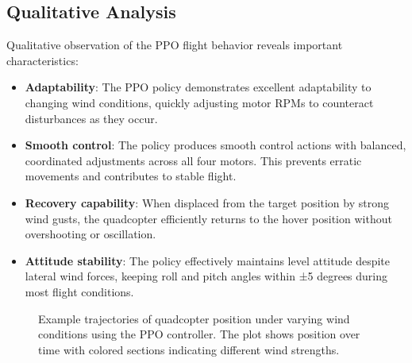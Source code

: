\documentclass[12pt]{article}
\begin{document}
\subsection{Qualitative Analysis}

Qualitative observation of the PPO flight behavior reveals important characteristics:


\begin{itemize}
    \item \textbf{Adaptability}: The PPO policy demonstrates excellent adaptability to changing wind conditions, quickly adjusting motor RPMs to counteract disturbances as they occur.
    
    \item \textbf{Smooth control}: The policy produces smooth control actions with balanced, coordinated adjustments across all four motors. This prevents erratic movements and contributes to stable flight.
    
    \item \textbf{Recovery capability}: When displaced from the target position by strong wind gusts, the quadcopter efficiently returns to the hover position without overshooting or oscillation.
    
    \item \textbf{Attitude stability}: The policy effectively maintains level attitude despite lateral wind forces, keeping roll and pitch angles within ±5 degrees during most flight conditions.
\end{itemize}

%     
%     
%     

\begin{figure}[htbp]
\centering
\caption{Example trajectories of quadcopter position under varying wind conditions using the PPO controller. The plot shows position over time with colored sections indicating different wind strengths.}
\label{fig:trajectories}
\end{figure}
\end{document}
